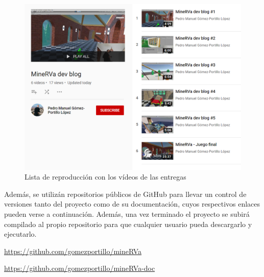 \begin{figure}[!h]
\begin{center}
\includegraphics[width=1\textwidth]{imagenes/5/playlist.png}
\caption{Lista de reproducción con los vídeos de las entregas}
\label{fig:playlist}
\end{center}
\end{figure}

Además, se utilizán repositorios públicos de GitHub para llevar un control de versiones tanto del proyecto como de su documentación, cuyos respectivos enlaces pueden verse a continuación. Además, una vez terminado el proyecto se subirá compilado al propio repositorio para que cualquier usuario pueda descargarlo y ejecutarlo.

\begin{center}
    \url{https://github.com/gomezportillo/mineRVa}
    
    \bigskip
    
    \url{https://github.com/gomezportillo/mineRVa-doc}
\end{center}